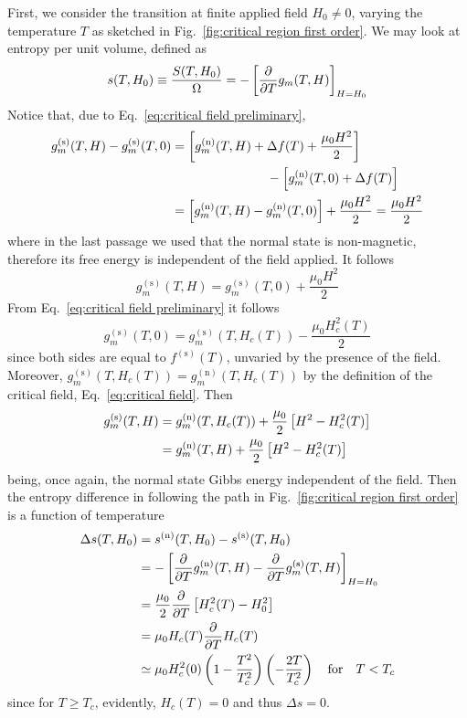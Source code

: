 First, we consider the transition at finite applied field $H_0 \neq 0$, varying the temperature $T$ as sketched in Fig.~\ref{fig:critical region first order}. We may look at entropy per unit volume, defined as
\[
    s(T,H_0) \equiv \frac{S(T,H_0)}{\Omega} = -\left[{ \pdv{}{T} g_{m}(T, H) }\right]_{H = H_0}
\]
Notice that, due to Eq.~\eqref{eq:critical field preliminary},
\[
\begin{aligned}
    g_m^{(\mathrm{s})} (T,H) - g_m^{(\mathrm{s})} (T,0) &= \left[{ g_m^{(\mathrm{n})} (T,H) + \Delta f(T) + \frac{\mu_0 H^2}{2} }\right]\\
    &\hspace{7.5em}- \left[{ g_m^{(\mathrm{n})} (T,0) + \Delta f(T) }\right] \\
    &= \left[{ g_m^{(\mathrm{n})} (T,H) - g_m^{(\mathrm{n})} (T,0) }\right] + \frac{\mu_0 H^2}{2} = \frac{\mu_0 H^2}{2}
\end{aligned}
\]
where in the last passage we used that the normal state is non-magnetic, therefore its free energy is independent of the field applied. It follows
\[
    g_m^{(\mathrm{s})} (T,H) = g_m^{(\mathrm{s})} (T,0) + \frac{\mu_0 H^2}{2}
\]
From Eq.~\eqref{eq:critical field preliminary} it follows
\[
    g_m^{(\mathrm{s})}(T,0) = g_m^{(\mathrm{s})}(T,H_c(T)) - \frac{\mu_0 H_c^2(T)}{2}
\]
since both sides are equal to $f^{(\mathrm{s})}(T)$, unvaried by the presence of the field. Moreover, $g_m^{(\mathrm{s})}(T,H_c(T)) = g_m^{(\mathrm{n})}(T,H_c(T))$ by the definition of the critical field, Eq.~\eqref{eq:critical field}. Then
\[
\begin{aligned}
    g_m^{(\mathrm{s})} (T,H) &= g_m^{(\mathrm{n})} (T,H_c(T)) + \frac{\mu_0}{2} \left[{ H^2 - H_c^2(T) }\right] \\
    &= g_m^{(\mathrm{n})} (T,H) + \frac{\mu_0}{2} \left[{ H^2 - H_c^2(T) }\right]
\end{aligned}
\]
being, once again, the normal state Gibbs energy independent of the field. Then the entropy difference in following the path in Fig.~\ref{fig:critical region first order} is a function of temperature
\[
\begin{aligned}
    \Delta s(T,H_0) &= s^{(\mathrm{n})}(T,H_0) - s^{(\mathrm{s})}(T,H_0) \\
                    &= -\lrS{ \pdv{}{T} g_m^{(\mathrm{n})}(T, H) - \pdv{}{T} g_m^{(\mathrm{s})}(T, H) }_{H = H_0} \\
                    &= \frac{\mu_0}{2} \pdv{}{T} \lrS{ H_c^2(T) - H_0^2 }\\
                    &= \mu_0 H_c(T) \pdv{}{T} H_c(T)\\
                    &\simeq \mu_0 H_c^2 (0) \lrR{1 - \frac{T^2}{T_c^2}} \lrR{ - \frac{2T}{T_c^2} } \qq{for} T < T_c
\end{aligned}
\]
since for $T \ge T_c$, evidently, $H_c(T) = 0$ and thus $\Delta s = 0$.

